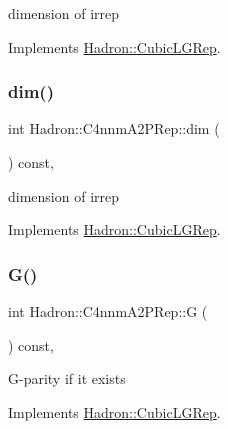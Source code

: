 dimension of irrep 

Implements \mbox{\hyperlink{structHadron_1_1CubicLGRep_a3acbaea26503ed64f20df693a48e4cdd}{Hadron\+::\+Cubic\+L\+G\+Rep}}.

\mbox{\label{structHadron_1_1C4nnmA2PRep_a3865ab495cd2e1f4ebd33dae51d96017}} 
\subsubsection{\texorpdfstring{dim()}{dim()}\hspace{0.1cm}{\footnotesize\ttfamily [2/2]}}
{\footnotesize\ttfamily int Hadron\+::\+C4nnm\+A2\+P\+Rep\+::dim (\begin{DoxyParamCaption}{ }\end{DoxyParamCaption}) const\hspace{0.3cm}{\ttfamily [inline]}, {\ttfamily [virtual]}}

dimension of irrep 

Implements \mbox{\hyperlink{structHadron_1_1CubicLGRep_a3acbaea26503ed64f20df693a48e4cdd}{Hadron\+::\+Cubic\+L\+G\+Rep}}.

\mbox{\label{structHadron_1_1C4nnmA2PRep_a5a93c463248b9a612bfce17349d772eb}} 
\subsubsection{\texorpdfstring{G()}{G()}\hspace{0.1cm}{\footnotesize\ttfamily [1/2]}}
{\footnotesize\ttfamily int Hadron\+::\+C4nnm\+A2\+P\+Rep\+::G (\begin{DoxyParamCaption}{ }\end{DoxyParamCaption}) const\hspace{0.3cm}{\ttfamily [inline]}, {\ttfamily [virtual]}}

G-\/parity if it exists 

Implements \mbox{\hyperlink{structHadron_1_1CubicLGRep_ace26f7b2d55e3a668a14cb9026da5231}{Hadron\+::\+Cubic\+L\+G\+Rep}}.

\mbox{\label{structHadron_1_1C4nnmA2PRep_a5a93c463248b9a612bfce17349d772eb}} 
